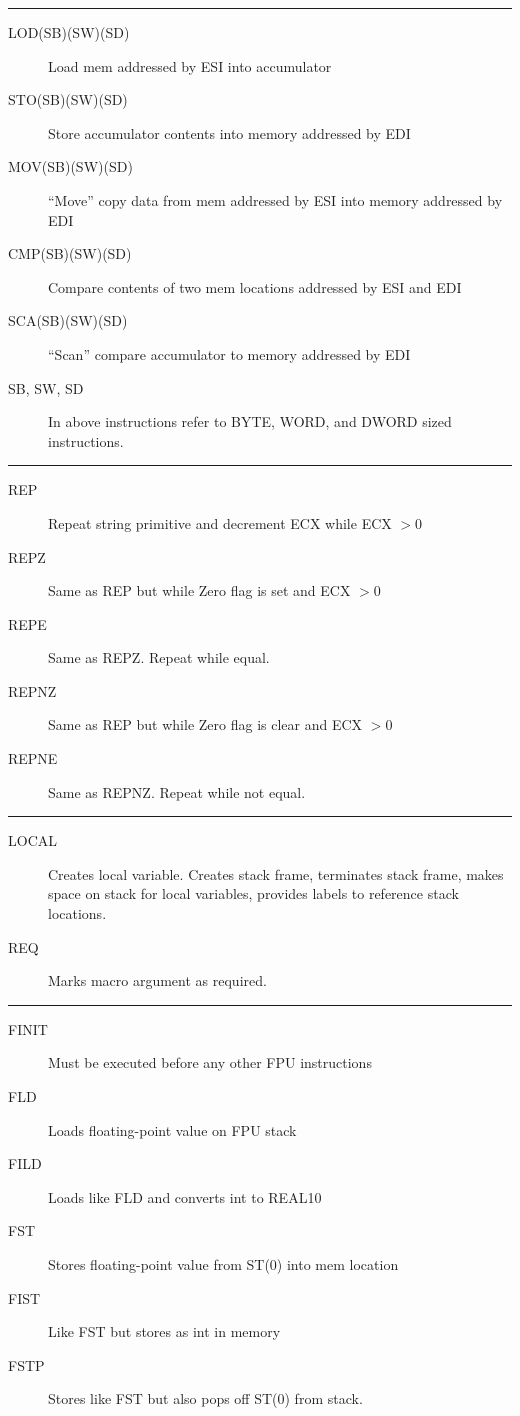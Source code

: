 \documentclass[10pt,landscape]{article}
\newcommand{\mysep}{\vspace{0.1cm}\hrule\vspace{0.1cm}}
\begin{document}
\begin{multicols*}{3}
\mysep

\begin{description}
	\item[LOD(SB)(SW)(SD)] Load mem addressed by ESI into accumulator
	\item[STO(SB)(SW)(SD)] Store accumulator contents into memory addressed by EDI
  \item[MOV(SB)(SW)(SD)] ``Move'' copy data from mem addressed by ESI into
    memory addressed by EDI
	\item[CMP(SB)(SW)(SD)] Compare contents of two mem locations addressed by ESI 
		and EDI
	\item[SCA(SB)(SW)(SD)] ``Scan'' compare accumulator to memory addressed by EDI
	\item[SB, SW, SD] In above instructions refer to BYTE, WORD, and DWORD sized
		instructions.
\end{description}

\mysep

\begin{description}
	\item[REP] Repeat string primitive and decrement ECX while ECX $> 0$
	\item[REPZ] Same as REP but while Zero flag is set and ECX $> 0$
	\item[REPE]  Same as REPZ. Repeat while equal.
	\item[REPNZ] Same as REP but while Zero flag is clear and ECX $> 0$
	\item[REPNE] Same as REPNZ. Repeat while not equal.
\end{description}

\mysep

\begin{description}
  \item[LOCAL] Creates local variable. Creates stack frame, terminates stack
    frame, makes space on stack for local variables, provides labels to
    reference stack locations.
	\item[REQ] Marks macro argument as required.
\end{description}

\mysep

\begin{description}
	\item[FINIT] Must be executed before any other FPU instructions
	\item[FLD] Loads floating-point value on FPU stack
	\item[FILD] Loads like FLD and converts int to REAL10 
	\item[FST] Stores floating-point value from ST(0) into mem location
	\item[FIST] Like FST but stores as int in memory
	\item[FSTP] Stores like FST but also pops off ST(0) from stack.
\end{description}


\end{multicols*}
\end{document}
